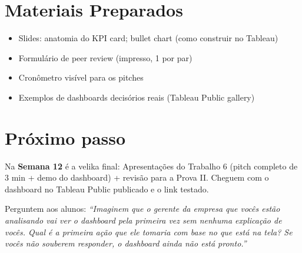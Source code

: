 \section{Materiais Preparados}
\begin{itemize}
  \item Slides: anatomia do KPI card; bullet chart (como construir no Tableau)
  \item Formulário de peer review (impresso, 1 por par)
  \item Cronômetro visível para os pitches
  \item Exemplos de dashboards decisórios reais (Tableau Public gallery)
\end{itemize}

\section{Próximo passo}

Na \textbf{Semana 12} é a velika final: Apresentações do Trabalho 6
(pitch completo de 3 min + demo do dashboard) + revisão para a Prova II.
Cheguem com o dashboard no Tableau Public publicado e o link testado.

Perguntem aos alunos: \textit{``Imaginem que o gerente da empresa que vocês
estão analisando vai ver o dashboard pela primeira vez sem nenhuma explicação
de vocês. Qual é a primeira ação que ele tomaria com base no que está na tela?
Se vocês não souberem responder, o dashboard ainda não está pronto.''}
